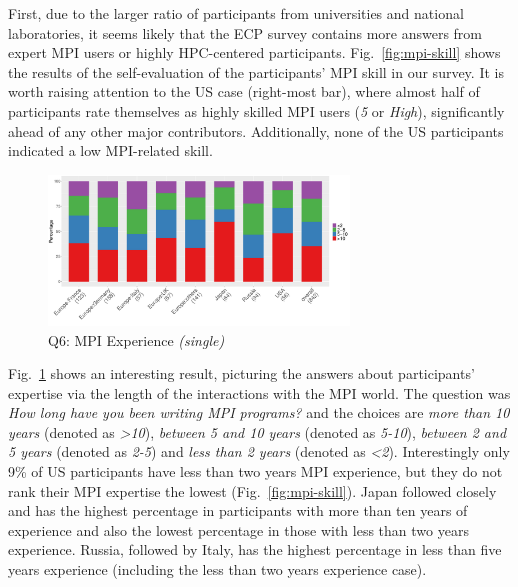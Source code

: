 \documentclass[preprint,5p,times]{elsarticle}
\def\myquote#1{{\it #1}}
\newcommand{\revision}[2]{{\color{blue}#2}}
\def\mcountries{major contributors\xspace{}}%
\begin{document}
First, due to the larger ratio of participants from universities
and national laboratories, it seems likely that the ECP survey contains more
answers from expert MPI users or highly HPC-centered participants.
Fig.~\ref{fig:mpi-skill} shows the results of \revision{}{the} self-evaluation of the
participants' MPI skill in our survey.  It is worth raising attention to the US
case (right-most bar), where almost half of participants rate themselves as
highly skilled MPI users (\myquote{5} or \myquote{High}), significantly ahead
of any other \mcountries. Additionally, none of the US participants
indicated a low MPI-related skill.

\begin{figure}[tb]
  \begin{center}
    \includegraphics[width=8.0cm]{R-scripts/Q6.pdf}
    \vspace{-1.5mm}
    \caption{Q6: MPI Experience {\it(single)}}
    \label{fig:mpi-experience}
\vspace{-3mm}%
  \end{center}
\end{figure}

Fig.~\ref{fig:mpi-experience} shows an interesting result, picturing the answers
about participants' expertise via the length of the interactions with the MPI
world. The question was {\it How long have you been writing MPI programs?} and
the choices are {\it more than 10 years} (denoted as \myquote{\textgreater 10}),
\myquote{between 5 and 10 years} (denoted as \myquote{5-10}), \myquote{between 2
and 5 years} (denoted as \myquote{2-5}) and \myquote{less than 2 years} (denoted
as \myquote{\textless 2}). Interestingly only 9\% of US participants have less
than \revision{2}{two} years MPI experience, but they do
\revision{no}{not} rank their MPI expertise the lowest
(Fig.~\ref {fig:mpi-skill}). Japan followed closely \revision{}{and} has the highest percentage
in participants with more than \revision{10}{ten} years of experience
and also the lowest
percentage in those with less than \revision{2}{two} years experience. Russia, followed by
Italy, has the highest percentage in less than \revision{5}{five} years experience (including the
less than \revision{2}{two} years experience case).
\end{document}
